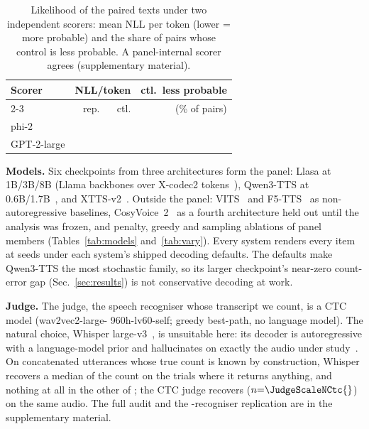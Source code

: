 \documentclass{article}
\newcommand{\tabsize}{\small}
\begin{document}
\begin{table}[t]
\centering
\caption{Likelihood of the paired texts under two independent scorers:
mean NLL per token (lower = more probable) and the share of
\NllIndPairs{} pairs whose control is less probable. A panel-internal
scorer agrees (supplementary material).}
\label{tab:nll}
{\tabsize\setlength{\tabcolsep}{4pt}
\begin{tabular}{lrrr}
\toprule
Scorer & \multicolumn{2}{c}{NLL/token} & ctl.\ less probable \\
\cmidrule(lr){2-3}
 & rep. & ctl. & (\% of pairs) \\
\midrule
phi-2       & \NllPhiRep{} & \NllPhiCtl{} & \NllIndCtlHigherPct{} \\
GPT-2-large & \NllGptRep{} & \NllGptCtl{} & \NllGptPct{} \\
\bottomrule
\end{tabular}}
\end{table}

\textbf{Models.}
Six checkpoints from three architectures form the panel: Llasa at 1B/3B/8B
(Llama backbones over X-codec2 tokens~\cite{ye2025llasa}), Qwen3-TTS at
0.6B/1.7B~\cite{hu2026qwen3tts}, and XTTS-v2~\cite{casanova2024xtts}.
Outside the panel: VITS~\cite{kim2021vits} and F5-TTS~\cite{chen2024f5tts}
as non-autoregressive baselines, CosyVoice~2~\cite{du2024cosyvoice2} as a
fourth architecture held out until the
analysis was frozen, and penalty, greedy and sampling ablations of panel
members (Tables~\ref{tab:models} and~\ref{tab:vary}). Every system renders every item at
\NSeeds{} seeds under each system's shipped decoding defaults. The defaults make
Qwen3-TTS the most stochastic family, so its larger checkpoint's
near-zero count-error gap (Sec.~\ref{sec:results}) is not conservative
decoding at work.

\textbf{Judge.}
The judge, the speech recogniser whose transcript we count, is a CTC
model ({\ttfamily wav2vec2-\allowbreak large-\allowbreak
960h-\allowbreak lv60-\allowbreak self}; greedy best-path, no language
model). The natural choice, Whisper large-v3~\cite{radford2023whisper}, is
unsuitable here: its decoder is autoregressive with a language-model prior
and hallucinates on exactly the audio under
study~\cite{viakhirev2026dispersion}. On concatenated utterances whose true count is known by construction,
Whisper recovers a median
\JudgeScaleWhisperMed{} of the count on the \JudgeScaleNWhisper{} trials
where it returns anything, and nothing at all in the other
\JudgeScaleNWhisperErr{} of \JudgeScaleNWhisperAll{}; the CTC judge
recovers \JudgeScaleCtcMed{} ($n{=}\JudgeScaleNCtc{}$) on the same audio.
The full audit and the \IndNJudges{}-recogniser replication are in the
supplementary material.
\end{document}
